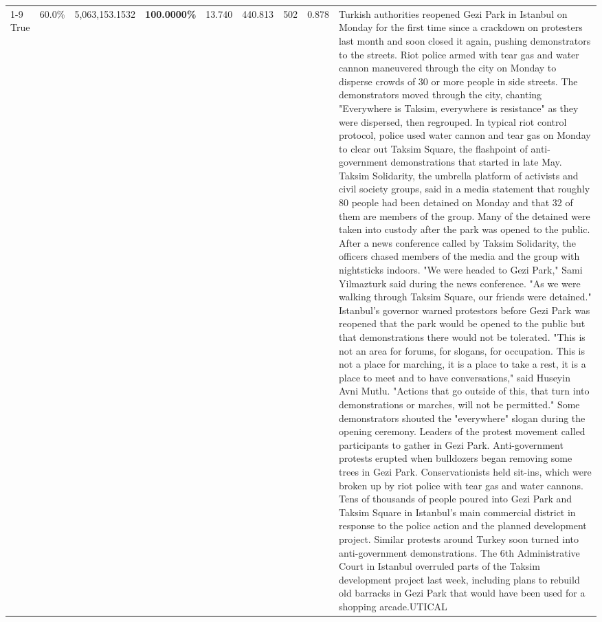 \begin{table}[H]
\begin{tabular}{lllrlllll}
\cline{1-9}
True & 60.0\% & 5,063,153.1532 & \bfseries \color{red} 100.0000\% & 13.740 & 440.813 & 502 & 0.878 & Turkish authorities reopened Gezi Park in Istanbul on Monday for the first time since a crackdown on protesters last month and soon closed it again, pushing demonstrators to the streets. Riot police armed with tear gas and water cannon maneuvered through the city on Monday to disperse crowds of 30 or more people in side streets. The demonstrators moved through the city, chanting "Everywhere is Taksim, everywhere is resistance" as they were dispersed, then regrouped. In typical riot control protocol, police used water cannon and tear gas on Monday to clear out Taksim Square, the flashpoint of anti-government demonstrations that started in late May. Taksim Solidarity, the umbrella platform of activists and civil society groups, said in a media statement that roughly 80 people had been detained on Monday and that 32 of them are members of the group. Many of the detained were taken into custody after the park was opened to the public. After a news conference called by Taksim Solidarity, the officers chased members of the media and the group with nightsticks indoors. "We were headed to Gezi Park," Sami Yilmazturk said during the news conference. "As we were walking through Taksim Square, our friends were detained." Istanbul's governor warned protestors before Gezi Park was reopened that the park would be opened to the public but that demonstrations there would not be tolerated. "This is not an area for forums, for slogans, for occupation. This is not a place for marching, it is a place to take a rest, it is a place to meet and to have conversations," said Huseyin Avni Mutlu. "Actions that go outside of this, that turn into demonstrations or marches, will not be permitted." Some demonstrators shouted the "everywhere" slogan during the opening ceremony. Leaders of the protest movement called participants to gather in Gezi Park. Anti-government protests erupted when bulldozers began removing some trees in Gezi Park. Conservationists held sit-ins, which were broken up by riot police with tear gas and water cannons. Tens of thousands of people poured into Gezi Park and Taksim Square in Istanbul's main commercial district in response to the police action and the planned development project. Similar protests around Turkey soon turned into anti-government demonstrations. The 6th Administrative Court in Istanbul overruled parts of the Taksim development project last week, including plans to rebuild old barracks in Gezi Park that would have been used for a shopping arcade.UTICAL \\

\end{tabular}
\end{table}
